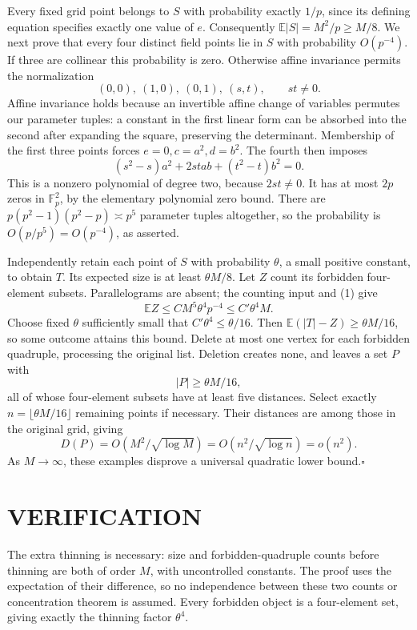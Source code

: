 Every fixed grid point belongs to $S$ with probability exactly $1/p$,
since its defining equation specifies exactly one value of $e$.
Consequently $\mathbb E|S|=M^2/p\ge M/8$.
We next prove that every four distinct field points lie in $S$ with
probability $O(p^{-4})$. If three are collinear this probability is
zero. Otherwise affine invariance permits the normalization
\[
 (0,0),\ (1,0),\ (0,1),\ (s,t),\qquad st\ne0.
\]
Affine invariance holds because an invertible affine change of variables
permutes our parameter tuples: a constant in the first linear form
can be absorbed into the second after expanding the square, preserving
the determinant. Membership of the first three points forces
$e=0,c=a^2,d=b^2$. The fourth then imposes
\[
 (s^2-s)a^2+2stab+(t^2-t)b^2=0.                         \tag{1}
\]
This is a nonzero polynomial of degree two, because $2st\ne0$.
It has at most $2p$ zeros in $\mathbb F_p^2$, by the elementary
polynomial zero bound. There are
$p(p^2-1)(p^2-p)\asymp p^5$ parameter tuples altogether, so the
probability is $O(p/p^5)=O(p^{-4})$, as asserted.

Independently retain each point of $S$ with probability $\theta$, a
small positive constant, to obtain $T$. Its expected size is at least
$\theta M/8$. Let $Z$ count its forbidden four-element subsets.
Parallelograms are absent; the counting input and (1) give
\[
 \mathbb EZ\le C M^5\theta^4p^{-4}\le C'\theta^4M.
\]
Choose fixed $\theta$ sufficiently small that $C'\theta^4\le\theta/16$.
Then $\mathbb E(|T|-Z)\ge\theta M/16$, so some outcome attains this
bound. Delete at most one vertex for each forbidden quadruple, processing
the original list. Deletion creates none, and leaves a set $P$ with
\[
 |P|\ge\theta M/16,
\]
all of whose four-element subsets have at least five distances.
Select exactly $n=\lfloor\theta M/16\rfloor$ remaining points if
necessary. Their distances are among those in the original grid, giving
\[
 D(P)=O(M^2/\sqrt{\log M})=O(n^2/\sqrt{\log n})=o(n^2).
\]
As $M\to\infty$, these examples disprove a universal quadratic lower
bound.\hfill$\square$

\section{VERIFICATION}
The extra thinning is necessary: size and forbidden-quadruple counts
before thinning are both of order $M$, with uncontrolled constants.
The proof uses the expectation of their difference, so no independence
between these two counts or concentration theorem is assumed. Every
forbidden object is a four-element set, giving exactly the thinning
factor $\theta^4$.

